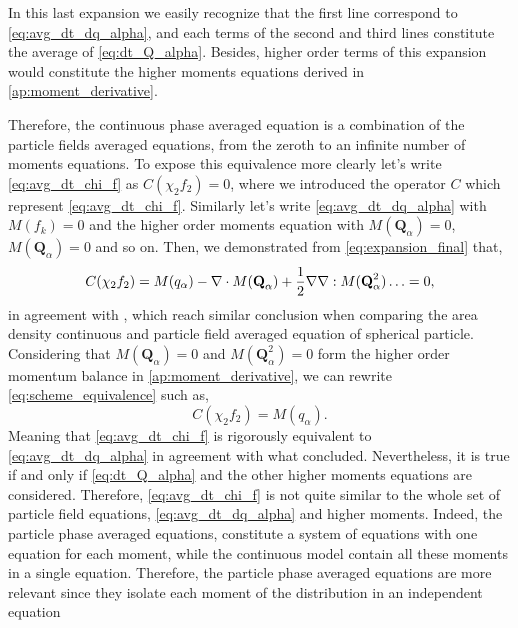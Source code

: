 In this last expansion we easily recognize that the first line correspond to \ref{eq:avg_dt_dq_alpha}, and each terms of the second and third lines constitute the average of \ref{eq:dt_Q_alpha}. 
Besides, higher order terms of this expansion would constitute the higher moments equations derived in \ref{ap:moment_derivative}. 

Therefore, the continuous phase averaged equation is a combination of the particle fields averaged equations, from the zeroth to an infinite number of moments equations. 
To expose this equivalence more clearly let's write \ref{eq:avg_dt_chi_f} as $C(\chi_2f_2) = 0$, where we introduced the operator $C$ which represent  \ref{eq:avg_dt_chi_f}.
Similarly let's write \ref{eq:avg_dt_dq_alpha} with $M(f_k) = 0$ and the higher order moments equation with  $M(\textbf{Q}_\alpha) =0$, $M(\textbf{Q}_\alpha) =0$ and so on.
Then, we demonstrated from \ref{eq:expansion_final} that, 
\begin{equation}
    C(\chi_2 f_2) = M(q_\alpha) - \mathbf{\nabla} \cdot M(\textbf{Q}_\alpha) + \frac{1}{2} \mathbf{\nabla}\mathbf{\nabla} : M(\textbf{Q}^2_\alpha) \ldots = 0,
    \label{eq:scheme_equivalence}
\end{equation} 
in agreement with \cite{lhuillier2000bilan}, which reach similar conclusion when comparing the area density continuous and particle field averaged equation of spherical particle. 
Considering that $M(\textbf{Q}_\alpha) =0$ and $M(\textbf{Q}^2_\alpha) =0$ form the higher order momentum balance in \ref{ap:moment_derivative}, we can rewrite \ref{eq:scheme_equivalence} such as, 
\begin{equation}
    C(\chi_2 f_2) = M(q_\alpha).
\end{equation}
Meaning that \ref{eq:avg_dt_chi_f} is rigorously equivalent to \ref{eq:avg_dt_dq_alpha} in agreement with what \cite{nott2011suspension} concluded.
Nevertheless, it is true if and only if \ref{eq:dt_Q_alpha} and the other higher moments equations are considered.
Therefore, \ref{eq:avg_dt_chi_f} is not quite similar to the whole set of particle field equations, \ref{eq:avg_dt_dq_alpha} and higher moments.
Indeed, the particle phase averaged equations, constitute a system of equations with one equation for each moment, while the continuous model contain all these moments in a single equation. 
Therefore, the particle phase averaged equations are more relevant since they isolate each moment of the distribution in an independent equation 


